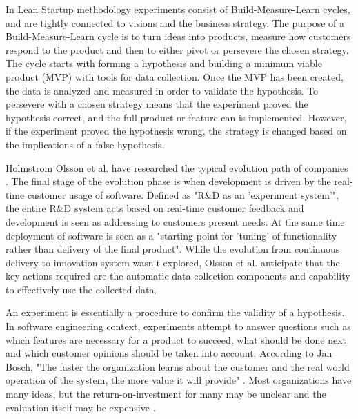 \documentclass[english]{tktltiki2}
\theoremstyle{definition}
\theoremstyle{remark}
\begin{document}
In Lean Startup methodology \cite{ries2011lean} experiments consist of Build-Measure-Learn cycles, and are tightly connected to visions and the business strategy. The purpose of a Build-Measure-Learn cycle is to turn ideas into products, measure how customers respond to the product and then to either pivot or persevere the chosen strategy. The cycle starts with forming a hypothesis and building a minimum viable product (MVP) with tools for data collection. Once the MVP has been created, the data is analyzed and measured in order to validate the hypothesis. To persevere with a chosen strategy means that the experiment proved the hypothesis correct, and the full product or feature can is implemented. However, if the experiment proved the hypothesis wrong, the strategy is changed based on the implications of a false hypothesis.

Holmström Olsson et al. have researched the typical evolution path of companies \cite{olsson2012climbing}. The final stage of the evolution phase is when development is driven by the real-time customer usage of software. Defined as "R\&D as an 'experiment system'", the entire R\&D system acts based on real-time customer feedback and development is seen as addressing to customers present needs. At the same time deployment of software is seen as a "starting point for 'tuning' of functionality rather than delivery of the final product". While the evolution from continuous delivery to innovation system wasn't explored, Olsson et al. anticipate that the key actions required are the automatic data collection components and capability to effectively use the collected data.


An experiment is essentially a procedure to confirm the validity of a hypothesis. In software engineering context, experiments attempt to answer questions such as which features are necessary for a product to succeed, what should be done next and which customer opinions should be taken into account. According to Jan Bosch, "The faster the organization learns about the customer and the real world operation of the system, the more value it will provide" \cite{bosch2012building}. Most organizations have many ideas, but the return-on-investment for many may be unclear and the evaluation itself may be expensive \cite{kohavi2007practical}. 
\end{document}
